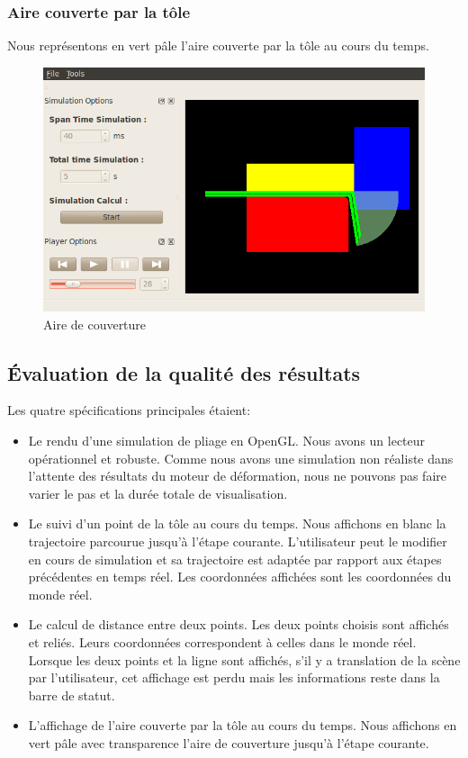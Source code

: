 \documentclass[a4paper, 11pt]{article}
\begin{document}
\subsubsection{Aire couverte par la tôle}
Nous représentons en vert pâle l'aire couverte par la tôle au cours du temps.
\begin{figure}[H]
    \begin{center}
        \includegraphics[width=.8\textwidth]{img/area.png}
    \end{center}
    \caption{Aire de couverture}
\end{figure}

\subsection{Évaluation de la qualité des résultats}
Les quatre spécifications principales étaient:
\begin{itemize}
        \renewcommand{\labelitemi}{$\bullet$}
    \item Le rendu d'une simulation de pliage en OpenGL.
        Nous avons un lecteur opérationnel et robuste.
        Comme nous avons une simulation non réaliste dans l'attente des résultats du moteur de déformation, nous ne pouvons pas faire varier le pas et la durée totale de visualisation.\\
    \item Le suivi d'un point de la tôle au cours du temps.
        Nous affichons en blanc la trajectoire parcourue jusqu'à l'étape courante.
        L'utilisateur peut le modifier en cours de simulation et sa trajectoire est adaptée par rapport aux étapes précédentes en temps réel.
        Les coordonnées affichées sont les coordonnées du monde réel.\\
    \item Le calcul de distance entre deux points.
        Les deux points choisis sont affichés et reliés.
        Leurs coordonnées correspondent à celles dans le monde réel.
        Lorsque les deux points et la ligne sont affichés, s'il y a translation de la scène par l'utilisateur, cet affichage est perdu mais les informations reste dans la barre de statut.\\
    \item L'affichage de l'aire couverte par la tôle au cours du temps.
        Nous affichons en vert pâle avec transparence l'aire de couverture jusqu'à l'étape courante.\\
\end{itemize}
\end{document}
